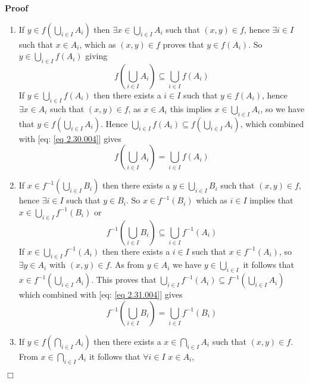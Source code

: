 \documentclass{book}
\newenvironment{proof}{\noindent\textbf{Proof\ }}{\hspace*{\fill}$\Box$\medskip}
\begin{document}
\begin{proof}
  
  \begin{enumerate}
    \item If $y \in f \left( \bigcup_{i \in I} A_i \right)$ then $\exists x
    \in \bigcup_{i \in I} A_i$ such that $(x, y) \in f$, hence $\exists i \in
    I$ such that $x \in A_i$, which as $(x, y) \in f$ proves that $y \in f
    (A_i)$. So $y \in \bigcup_{i \in I} f (A_i)$ giving
    \begin{equation}
      \label{eq 2.30.004} f \left( \bigcup_{i \in I} A_i \right) \subseteq
      \bigcup_{i \in I} f (A_i)
    \end{equation}
    If $y \in \bigcup_{i \in I} f (A_i)$ then there exists a $i \in I$ such
    that $y \in f (A_i)$, hence $\exists x \in A_i$ such that $(x, y) \in f$,
    as $x \in A_i$ this implies $x \in \bigcup_{i \in I} A_i$, so we have that
    $y \in f \left( \bigcup_{i \in I} A_i \right)$. Hence $\bigcup_{i \in I} f
    (A_i) \subseteq f \left( \bigcup_{i \in I} A_i \right)$, which combined
    with [eq: \ref{eq 2.30.004}] gives
    \[ f \left( \bigcup_{i \in I} A_i \right) = \bigcup_{i \in I} f (A_i) \]
    \item If $x \in f^{- 1} \left( \bigcup_{i \in I} B_i \right)$ then there
    exists a $y \in \bigcup_{i \in I} B_i$ such that $(x, y) \in f$, hence
    $\exists i \in I$ such that $y \in B_i$. So $x \in f^{- 1} (B_i)$ which as
    $i \in I$ implies that $x \in \bigcup_{i \in I} f^{- 1} (B_i)$ or
    \begin{equation}
      \label{eq 2.31.004} f^{- 1} \left( \bigcup_{i \in I} B_i \right)
      \subseteq \bigcup_{i \in I} f^{- 1} (A_i)
    \end{equation}
    If $x \in \bigcup_{i \in I} f^{- 1} (A_i)$ then there exists a $i \in I$
    such that $x \in f^{- 1} (A_i)$, so $\exists y \in A_i$ with $(x, y) \in
    f$. As from $y \in A_i$ we have $y \in \bigcup_{i \in I}$ it follows that
    $x \in f^{- 1} \left( \bigcup_{i \in I} A_i \right)$. This proves that
    $\bigcup_{i \in I} f^{- 1} (A_i) \subseteq f^{- 1} \left( \bigcup_{i \in
    I} A_i \right)$ which combined with [eq: \ref{eq 2.31.004}] gives
    \[ f^{- 1} \left( \bigcup_{i \in I} B_i \right) = \bigcup_{i \in I} f^{-
       1} (B_i) \]
    \item If $y \in f \left( \bigcap_{i \in I} A_i \right)$ then there exists
    a $x \in \bigcap_{i \in I} A_i$ such that $(x, y) \in f$. From $x \in
    \bigcap_{i \in I} A_i$ it follows that $\forall i \in I$ $x \in A_i$,

\end{enumerate}
\end{proof}
\end{document}
